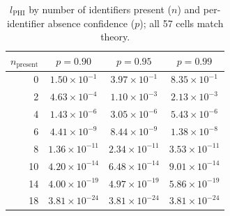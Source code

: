 
\begin{table}[t]
\centering
\caption{$l_{\text{PHI}}$ by number of identifiers present ($n$) and per-identifier absence confidence ($p$); all 57 cells match theory.}
\label{tab:phi_degradation}
\footnotesize
\begin{tabular}{@{}rccc@{}}
\toprule
$n_{\text{present}}$ & $p = 0.90$ & $p = 0.95$ & $p = 0.99$ \\
\midrule
0  & $1.50 \times 10^{-1}$ & $3.97 \times 10^{-1}$ & $8.35 \times 10^{-1}$ \\
2  & $4.63 \times 10^{-4}$ & $1.10 \times 10^{-3}$ & $2.13 \times 10^{-3}$ \\
4  & $1.43 \times 10^{-6}$ & $3.05 \times 10^{-6}$ & $5.43 \times 10^{-6}$ \\
6  & $4.41 \times 10^{-9}$ & $8.44 \times 10^{-9}$ & $1.38 \times 10^{-8}$ \\
8  & $1.36 \times 10^{-11}$ & $2.34 \times 10^{-11}$ & $3.53 \times 10^{-11}$ \\
10 & $4.20 \times 10^{-14}$ & $6.48 \times 10^{-14}$ & $9.01 \times 10^{-14}$ \\
14 & $4.00 \times 10^{-19}$ & $4.97 \times 10^{-19}$ & $5.86 \times 10^{-19}$ \\
18 & $3.81 \times 10^{-24}$ & $3.81 \times 10^{-24}$ & $3.81 \times 10^{-24}$ \\
\bottomrule
\end{tabular}
\end{table}
